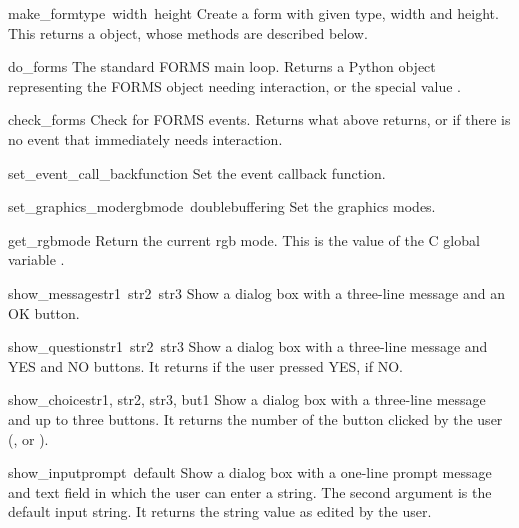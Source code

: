\begin{funcdesc}{make_form}{type\, width\, height}
Create a form with given type, width and height.  This returns a
 object, whose methods are described below.
\end{funcdesc}

\begin{funcdesc}{do_forms}{}
The standard FORMS main loop.  Returns a Python object representing
the FORMS object needing interaction, or the special value
.
\end{funcdesc}

\begin{funcdesc}{check_forms}{}
Check for FORMS events.  Returns what  above returns,
or  if there is no event that immediately needs
interaction.
\end{funcdesc}

\begin{funcdesc}{set_event_call_back}{function}
Set the event callback function.
\end{funcdesc}

\begin{funcdesc}{set_graphics_mode}{rgbmode\, doublebuffering}
Set the graphics modes.
\end{funcdesc}

\begin{funcdesc}{get_rgbmode}{}
Return the current rgb mode.  This is the value of the C global
variable .
\end{funcdesc}

\begin{funcdesc}{show_message}{str1\, str2\, str3}
Show a dialog box with a three-line message and an OK button.
\end{funcdesc}

\begin{funcdesc}{show_question}{str1\, str2\, str3}
Show a dialog box with a three-line message and YES and NO buttons.
It returns  if the user pressed YES,  if NO.
\end{funcdesc}

\begin{funcdesc}{show_choice}{str1, str2, str3, but1}
Show a dialog box with a three-line message and up to three buttons.
It returns the number of the button clicked by the user
(,  or ).
\end{funcdesc}

\begin{funcdesc}{show_input}{prompt\, default}
Show a dialog box with a one-line prompt message and text field in
which the user can enter a string.  The second argument is the default
input string.  It returns the string value as edited by the user.
\end{funcdesc}

